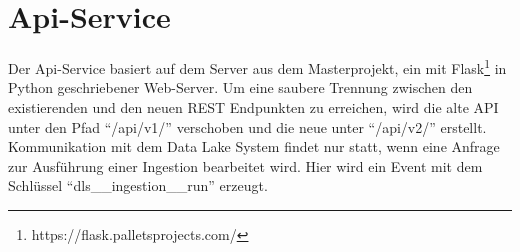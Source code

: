 \section{Api-Service}

Der Api-Service basiert auf dem Server aus dem Masterprojekt, ein mit Flask\footnote{https://flask.palletsprojects.com/} in Python geschriebener Web-Server.
Um eine saubere Trennung zwischen den existierenden und den neuen REST Endpunkten zu erreichen, wird die alte API unter den Pfad "`/api/v1/"' verschoben und die neue unter "`/api/v2/"' erstellt.
Kommunikation mit dem Data Lake System findet nur statt, wenn eine Anfrage zur Ausführung einer Ingestion bearbeitet wird.
Hier wird ein Event mit dem Schlüssel "`dls\_\_ingestion\_\_run"' erzeugt.